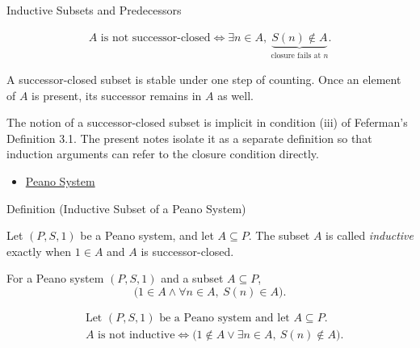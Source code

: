 \begin{topicbox}{Inductive Subsets and Predecessors}
\begin{remark*}
\begin{description}
\[
  \begin{aligned}
  A \text{ is not successor-closed}
  \Longleftrightarrow
  \exists n \in A,\ \underbrace{S(n) \notin A}_{\text{closure fails at } n}.
  \end{aligned}
  \]
\end{description}
\end{remark*}

\begin{remark*}[Interpretation]
A successor-closed subset is stable under one step of counting. Once an
element of $A$ is present, its successor remains in $A$ as well.
\end{remark*}

\begin{remark*}
The notion of a successor-closed subset is implicit in condition (iii) of
Feferman's Definition 3.1. The present notes isolate it as a separate
definition so that induction arguments can refer to the closure condition
directly. \citep{FefermanNumberSystems1964}
\end{remark*}

\begin{dependencies}
\begin{itemize}
  \item \hyperref[def:peano-system]{Peano System}
\end{itemize}
\end{dependencies}

\begin{definitionbox}{Definition (Inductive Subset of a Peano System)}
\begin{definition}
\label{def:inductive-subset-of-peano-system}
Let $(P,S,1)$ be a Peano system, and let $A \subseteq P$. The subset $A$ is
called \emph{inductive} exactly when $1 \in A$ and $A$ is successor-closed.
\end{definition}
\end{definitionbox}

\begin{remark*}
For a Peano system $(P,S,1)$ and a subset $A\subseteq P$,
\[
\bigl(1 \in A \land
\forall n \in A,\ S(n) \in A\bigr).
\]
\end{remark*}

\begin{remark*}
\[
\begin{aligned}
&\text{Let } (P,S,1) \text{ be a Peano system and let } A \subseteq P.\\
&A \text{ is not inductive}
\Longleftrightarrow
\bigl(1 \notin A \lor \exists n \in A,\ S(n) \notin A\bigr).
\end{aligned}
\]
\end{remark*}


\end{topicbox}
